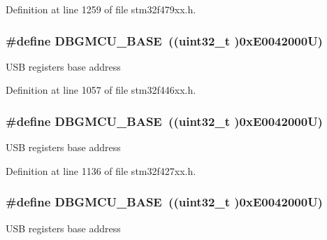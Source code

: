 Definition at line 1259 of file stm32f479xx.\+h.

\subsubsection[{\texorpdfstring{D\+B\+G\+M\+C\+U\+\_\+\+B\+A\+SE}{DBGMCU_BASE}}]{\setlength{\rightskip}{0pt plus 5cm}\#define D\+B\+G\+M\+C\+U\+\_\+\+B\+A\+SE~((uint32\+\_\+t )0x\+E0042000\+U)}\hypertarget{group___peripheral__memory__map_ga4adaf4fd82ccc3a538f1f27a70cdbbef}{}\label{group___peripheral__memory__map_ga4adaf4fd82ccc3a538f1f27a70cdbbef}
U\+SB registers base address 

Definition at line 1057 of file stm32f446xx.\+h.

\subsubsection[{\texorpdfstring{D\+B\+G\+M\+C\+U\+\_\+\+B\+A\+SE}{DBGMCU_BASE}}]{\setlength{\rightskip}{0pt plus 5cm}\#define D\+B\+G\+M\+C\+U\+\_\+\+B\+A\+SE~((uint32\+\_\+t )0x\+E0042000\+U)}\hypertarget{group___peripheral__memory__map_ga4adaf4fd82ccc3a538f1f27a70cdbbef}{}\label{group___peripheral__memory__map_ga4adaf4fd82ccc3a538f1f27a70cdbbef}
U\+SB registers base address 

Definition at line 1136 of file stm32f427xx.\+h.

\subsubsection[{\texorpdfstring{D\+B\+G\+M\+C\+U\+\_\+\+B\+A\+SE}{DBGMCU_BASE}}]{\setlength{\rightskip}{0pt plus 5cm}\#define D\+B\+G\+M\+C\+U\+\_\+\+B\+A\+SE~((uint32\+\_\+t )0x\+E0042000\+U)}\hypertarget{group___peripheral__memory__map_ga4adaf4fd82ccc3a538f1f27a70cdbbef}{}\label{group___peripheral__memory__map_ga4adaf4fd82ccc3a538f1f27a70cdbbef}
U\+SB registers base address 

